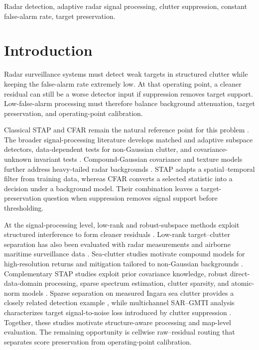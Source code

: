 \documentclass[journal]{IEEEtran}
\begin{document}
\begin{IEEEkeywords}
Radar detection, adaptive radar signal processing, clutter suppression, constant false-alarm rate, target preservation.
\end{IEEEkeywords}


\section{Introduction}

Radar surveillance systems must detect weak targets in structured clutter while keeping the false-alarm rate extremely low. At that operating point, a cleaner residual can still be a worse detector input if suppression removes target support. Low-false-alarm processing must therefore balance background attenuation, target preservation, and operating-point calibration.

Classical STAP and CFAR remain the natural reference point for this problem \cite{reed1974adaptive,ginolhac2014persymmetry,melvin2014stap,rohling1983cfar,kelly1986adaptive,gandhi1988cfar}. The broader signal-processing literature develops matched and adaptive subspace detectors, data-dependent tests for non-Gaussian clutter, and covariance-unknown invariant tests \cite{scharf1994matched,kraut2001adaptive,gini1999clairvoyant,demaio2007rao,conte1996amf,demaio2010invariance,liu2014doublesubspace}. Compound-Gaussian covariance and texture models further address heavy-tailed radar backgrounds \cite{candan2023covariance,ollila2012compound}. STAP adapts a spatial--temporal filter from training data, whereas CFAR converts a selected statistic into a decision under a background model. Their combination leaves a target-preservation question when suppression removes signal support before thresholding.

At the signal-processing level, low-rank and robust-subspace methods exploit structured interference to form cleaner residuals \cite{candes2011rpca,vaswani2018robustsubspace}. Low-rank target--clutter separation has also been evaluated with radar measurements and airborne maritime surveillance data \cite{yin2018lowrank,cao2020maritime}. Sea-clutter studies motivate compound models for high-resolution returns and mitigation tailored to non-Gaussian backgrounds \cite{ward1981compound,conte2004mitigation}. Complementary STAP studies exploit prior covariance knowledge, robust direct-data-domain processing, sparse spectrum estimation, clutter sparsity, and atomic-norm models \cite{stoica2008prior,cristallini2012robust,sun2011d3sr,yang2013sparsity,feng2018atomic}. Sparse separation on measured Ingara sea clutter provides a closely related detection example \cite{rosenberg2020sparse}, while multichannel SAR--GMTI analysis characterizes target signal-to-noise loss introduced by clutter suppression \cite{jao2023snrloss}. Together, these studies motivate structure-aware processing and map-level evaluation. The remaining opportunity is cellwise raw--residual routing that separates score preservation from operating-point calibration.
\end{document}
